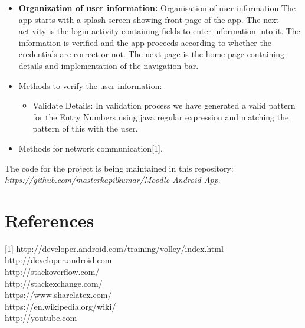 \documentclass[12pt]{article}
\begin{document}
\begin{itemize}
\item \textbf{Organization of user information:} Organisation of user information
The app starts with a splash screen showing front page of the app. The next activity is the login activity containing fields to enter information into it. The information is verified and the app proceeds according to whether the credentials are correct or not. The next page is the home page containing details and implementation of the navigation bar. 

    
\item Methods to verify the user information:
	\begin{itemize}
		\item 
		Validate Details: In validation process we have generated a valid pattern for the Entry Numbers using java regular expression and matching the pattern of this with the user.
	\end{itemize}
\item Methods for network communication[1].
\end{itemize}

The code for the project is being maintained in this repository: {\em https://github.com/masterkapilkumar/Moodle-Android-App}.


\section{References}
[1] http://developer.android.com/training/volley/index.html \\
http://developer.android.com \\
http://stackoverflow.com/ \\
http://stackexchange.com/ \\
https://www.sharelatex.com/ \\
https://en.wikipedia.org/wiki/ \\
http://youtube.com
\end{document}
